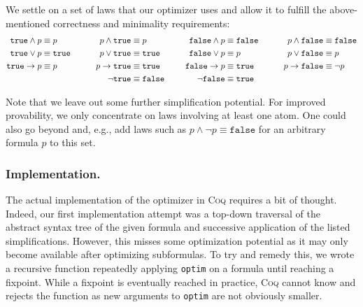 We settle on a set of laws that our optimizer uses and allow it to fulfill the above-mentioned correctness and minimality requirements:
\begin{alignat}{4}
    \texttt{true} \land p &\equiv p &p \land \texttt{true} &\equiv p &\texttt{false} \land p &\equiv \texttt{false}\hspace*{20pt}&p \land \texttt{false} &\equiv \texttt{false} \\
    \texttt{true} \lor p &\equiv \texttt{true}\hspace*{20pt}&p \lor \texttt{true} &\equiv \texttt{true}\hspace*{20pt}&\texttt{false} \lor p &\equiv p &p \lor \texttt{false} &\equiv p \\
    \texttt{true} \rightarrow p &\equiv p &p \rightarrow \texttt{true} &\equiv \texttt{true} &\texttt{false} \rightarrow p &\equiv \texttt{true} &p \rightarrow \texttt{false} &\equiv \neg p \\
    &&\neg \texttt{true} &\equiv \texttt{false} &\neg \texttt{false} &\equiv \texttt{true}
\end{alignat}

Note that we leave out some further simplification potential. 
For improved provability, we only concentrate on laws involving at least one atom.
One could also go beyond and, e.g., add laws such as $p \land \neg p \equiv \texttt{false}$ for an arbitrary formula $p$ to this set.

\subsubsection{Implementation.}

The actual implementation of the optimizer in \textsc{Coq} requires a bit of thought.
Indeed, our first implementation attempt was a top-down traversal of the abstract syntax tree of the given formula and successive application of the listed simplifications.
However, this misses some optimization potential as it may only become available after optimizing subformulas.
To try and remedy this, we wrote a recursive function repeatedly applying \texttt{optim} on a formula until reaching a fixpoint.
While a fixpoint is eventually reached in practice, \textsc{Coq} cannot know and rejects the function as new arguments to \texttt{optim} are not obviously smaller.

